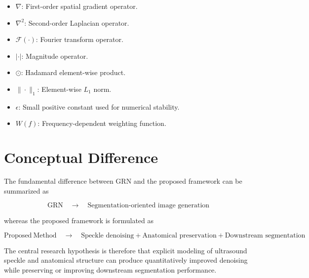 \documentclass[conference]{IEEEtran}
\begin{document}
\begin{itemize}
    \item $\nabla$: First-order spatial gradient operator.

    \item $\nabla^2$: Second-order Laplacian operator.

    \item $\mathcal{F}(\cdot)$: Fourier transform operator.

    \item $|\cdot|$: Magnitude operator.

    \item $\odot$: Hadamard element-wise product.

    \item $\|\cdot\|_1$: Element-wise $L_1$ norm.

    \item $\epsilon$: Small positive constant used for numerical
    stability.

    \item $W(f)$: Frequency-dependent weighting function.

\end{itemize}



\section{Conceptual Difference}

The fundamental difference between GRN and the proposed framework
can be summarized as

\begin{equation}
\boxed{
\mathrm{GRN}
\quad\rightarrow\quad
\text{Segmentation-oriented image generation}
}
\end{equation}

whereas the proposed framework is formulated as

\begin{equation}
\boxed{
\mathrm{Proposed\ Method}
\quad\rightarrow\quad
\text{Speckle denoising}
+
\text{Anatomical preservation}
+
\text{Downstream segmentation}
}
\end{equation}

The central research hypothesis is therefore that explicit modeling
of ultrasound speckle and anatomical structure can produce
quantitatively improved denoising while preserving or improving
downstream segmentation performance.
\end{document}
